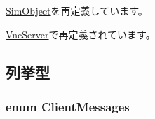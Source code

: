 \hyperlink{classSimObject_a0f0761d2db586a23bb2a2880b8f387bb}{SimObject}を再定義しています。

\hyperlink{classVncServer_a9bc94e8c47d227e70719e2f0b14d23d8}{VncServer}で再定義されています。

\subsection{列挙型}
\hypertarget{classVncInput_a58b5b2aadaeafc265dec196e8868cacd}{
\subsubsection[{ClientMessages}]{\setlength{\rightskip}{0pt plus 5cm}enum {\bf ClientMessages}}}
\label{classVncInput_a58b5b2aadaeafc265dec196e8868cacd}
